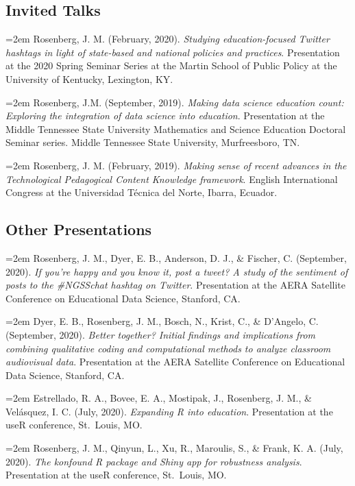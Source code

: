 \documentclass[
  11pt,
]{article}
\begin{document}
\hypertarget{invited-talks}{%
\subsection{Invited Talks}\label{invited-talks}}

\hangindent=2em Rosenberg, J. M. (February, 2020). \emph{Studying
education-focused Twitter hashtags in light of state-based and national
policies and practices}. Presentation at the 2020 Spring Seminar Series
at the Martin School of Public Policy at the University of Kentucky,
Lexington, KY.

\hangindent=2em Rosenberg, J.M. (September, 2019). \emph{Making data
science education count: Exploring the integration of data science into
education}. Presentation at the Middle Tennessee State University
Mathematics and Science Education Doctoral Seminar series. Middle
Tennessee State University, Murfreesboro, TN.

\hangindent=2em Rosenberg, J. M. (February, 2019). \emph{Making sense of
recent advances in the Technological Pedagogical Content Knowledge
framework}. English International Congress at the Universidad Técnica
del Norte, Ibarra, Ecuador.

\hypertarget{other-presentations}{%
\subsection{Other Presentations}\label{other-presentations}}

\hangindent=2em Rosenberg, J. M., Dyer, E. B., Anderson, D. J., \&
Fischer, C. (September, 2020). \emph{If you're happy and you know it,
post a tweet? A study of the sentiment of posts to the \#NGSSchat
hashtag on Twitter}. Presentation at the AERA Satellite Conference on
Educational Data Science, Stanford, CA.

\hangindent=2em Dyer, E. B., Rosenberg, J. M., Bosch, N., Krist, C., \&
D'Angelo, C. (September, 2020). \emph{Better together? Initial findings
and implications from combining qualitative coding and computational
methods to analyze classroom audiovisual data}. Presentation at the AERA
Satellite Conference on Educational Data Science, Stanford, CA.

\hangindent=2em Estrellado, R. A., Bovee, E. A., Mostipak, J.,
Rosenberg, J. M., \& Velásquez, I. C. (July, 2020). \emph{Expanding R
into education}. Presentation at the useR conference, St.~Louis, MO.

\hangindent=2em Rosenberg, J. M., Qinyun, L., Xu, R., Maroulis, S., \&
Frank, K. A. (July, 2020). \emph{The konfound R package and Shiny app
for robustness analysis}. Presentation at the useR conference,
St.~Louis, MO.
\end{document}
